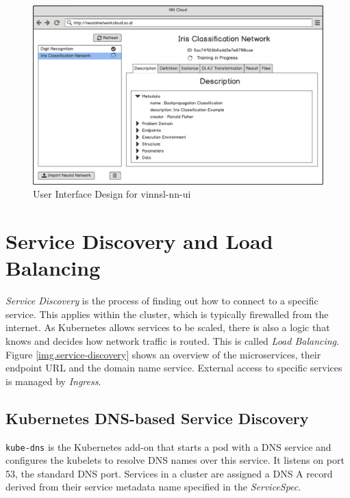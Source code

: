 \begin{figure}
\centering
\includegraphics[width=17.00000cm]{images/vinnsl-ui-design}
\caption{User Interface Design for vinnsl-nn-ui
\label{vinnsl-ui-design}}
\end{figure}

\section{Service Discovery and Load
Balancing}\label{service-discovery-and-load-balancing}

\emph{Service Discovery} is the process of finding out how to connect to
a specific service. This applies within the cluster, which is typically
firewalled from the internet. As Kubernetes allows services to be
scaled, there is also a logic that knows and decides how network traffic
is routed. This is called \emph{Load Balancing}. Figure
\ref{img.service-discovery} shows an overview of the microservices,
their endpoint URL and the domain name service. External access to
specific services is managed by \emph{Ingress}.

\subsection{Kubernetes DNS-based Service
Discovery}\label{kubernetes-dns-based-service-discovery}

\texttt{kube-dns} is the Kubernetes add-on that starts a pod with a DNS
service and configures the kubelets to resolve DNS names over this
service. It listens on port 53, the standard DNS port. Services in a
cluster are assigned a DNS A record derived from their service metadata
name specified in the \emph{ServiceSpec}. \cite{kub-dns-spec}

